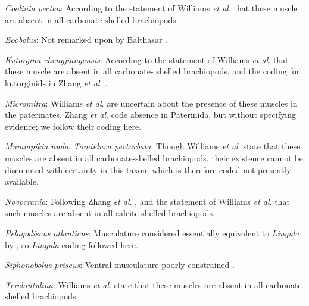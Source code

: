 \documentclass[openany]{book}
\theoremstyle{definition}
\theoremstyle{definition}
\theoremstyle{definition}
\theoremstyle{remark}
\begin{document}
\hypertarget{Coolinia_pecten-coding-71}{}
\emph{Coolinia pecten}: According to the statement of Williams \emph{et
al}. \citeyearpar[p.~32]{Williams2000LinguliformeaCraniiformea} that
these muscle are absent in all carbonate-shelled brachiopods.

\hypertarget{Eoobolus-coding-71}{}
\emph{Eoobolus}: Not remarked upon by Balthasar
\citeyearpar{Balthasar2009Thebrachiopod}.

\hypertarget{Kutorgina_chengjiangensis-coding-71}{}
\emph{Kutorgina chengjiangensis}: According to the statement of Williams
\emph{et al}. \citeyearpar[p.~32]{Williams2000LinguliformeaCraniiformea}
that these muscle are absent in all carbonate- shelled brachiopods, and
the coding for kutorginids in Zhang \emph{et al}.
\citeyearpar{Zhang2014Anearly}.

\hypertarget{Micromitra-coding-71}{}
\emph{Micromitra}: Williams \emph{et al}.
\citeyearpar[p.~32]{Williams2000LinguliformeaCraniiformea} are uncertain
about the presence of these muscles in the paterinates. Zhang \emph{et
al}. \citeyearpar{Zhang2014Anearly} code absence in Paterinida, but
without specifying evidence; we follow their coding here.

\hypertarget{Mummpikia_nuda-coding-71}{}
\emph{Mummpikia nuda}, \emph{Tomteluva perturbata}: Though Williams
\emph{et al}. \citeyearpar[p.~32]{Williams2000LinguliformeaCraniiformea}
state that these muscles are absent in all carbonate-shelled
brachiopods, their existence cannot be discounted with certainty in this
taxon, which is therefore coded not presently available.

\hypertarget{Novocrania-coding-71}{}
\emph{Novocrania}: Following Zhang \emph{et al}.
\citeyearpar{Zhang2014Anearly}, and the statement of Williams \emph{et
al}. \citeyearpar{Williams2000LinguliformeaCraniiformea} that such
muscles are absent in all calcite-shelled brachiopods.

\hypertarget{Pelagodiscus_atlanticus-coding-71}{}
\emph{Pelagodiscus atlanticus}: Musculature considered essentially
equivalent to \emph{Lingula} by
\citet{Williams2000LinguliformeaCraniiformea}, so \emph{Lingula} coding
followed here.

\hypertarget{Siphonobolus_priscus-coding-71}{}
\emph{Siphonobolus priscus}: Ventral musculature poorly constrained
\citep{Williams2000LinguliformeaCraniiformea, Popov2009Earlyontogeny}.

\hypertarget{Terebratulina-coding-71}{}
\emph{Terebratulina}: Williams \emph{et al}.
\citeyearpar[p.~32]{Williams2000LinguliformeaCraniiformea} state that
these muscles are absent in all carbonate-shelled brachiopods.
\end{document}
